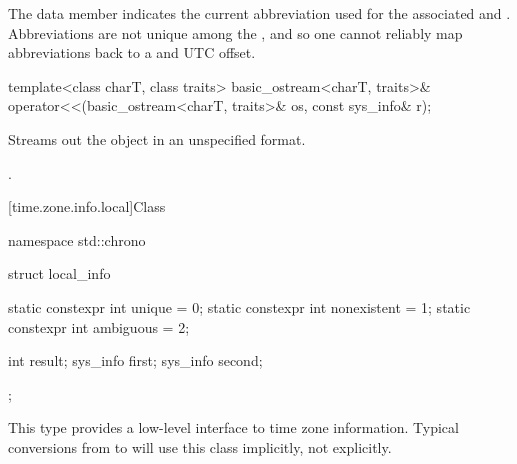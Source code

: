 \pnum
{}%
The  data member indicates
the current abbreviation used for the associated  and .
Abbreviations are not unique among the ,
and so one cannot reliably map abbreviations back to a  and UTC offset.

\begin{itemdecl}
template<class charT, class traits>
  basic_ostream<charT, traits>&
    operator<<(basic_ostream<charT, traits>& os, const sys_info& r);
\end{itemdecl}

\begin{itemdescr}
\pnum
\effects
Streams out the  object  in an unspecified format.

\pnum
\returns
{}.
\end{itemdescr}

[time.zone.info.local]{Class }

%
%
%
%
%
%
\begin{codeblock}
namespace std::chrono {
  struct local_info {
    static constexpr int unique      = 0;
    static constexpr int nonexistent = 1;
    static constexpr int ambiguous   = 2;

    int result;
    sys_info first;
    sys_info second;
  };
}
\end{codeblock}

\pnum
\begin{note}
This type provides a low-level interface to time zone information.
Typical conversions from  to 
will use this class implicitly, not explicitly.
\end{note}

